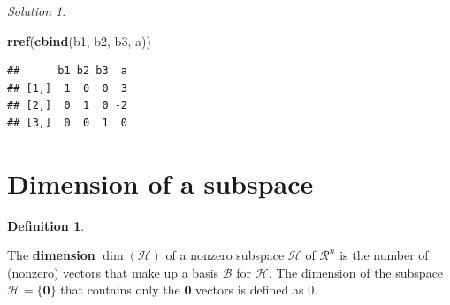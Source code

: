 \documentclass[
]{book}
\newenvironment{Shaded}{\begin{snugshade}}{\end{snugshade}}
\newcommand{\KeywordTok}[1]{\textcolor[rgb]{0.13,0.29,0.53}{\textbf{#1}}}
\newcommand{\NormalTok}[1]{#1}
\theoremstyle{definition}
\newtheorem{definition}{Definition}[chapter]
\theoremstyle{definition}
\theoremstyle{definition}
\theoremstyle{remark}
\newtheorem*{solution}{Solution}
\begin{document}
\begin{solution}
\begin{Shaded}
\begin{Highlighting}[]
\KeywordTok{rref}\NormalTok{(}\KeywordTok{cbind}\NormalTok{(b1, b2, b3, a))}
\end{Highlighting}
\end{Shaded}

\begin{verbatim}
##      b1 b2 b3  a
## [1,]  1  0  0  3
## [2,]  0  1  0 -2
## [3,]  0  0  1  0
\end{verbatim}

\end{solution}

\hypertarget{dimension-of-a-subspace}{%
\section{Dimension of a subspace}\label{dimension-of-a-subspace}}

\begin{definition}
\protect\hypertarget{def:dimension}{}\label{def:dimension}

The \textbf{dimension} \(\operatorname{dim}(\mathcal{H})\) of a nonzero subspace \(\mathcal{H}\) of \(\mathcal{R}^n\) is the number of (nonzero) vectors that make up a basis \(\mathcal{B}\) for \(\mathcal{H}\). The dimension of the subspace \(\mathcal{H} = \{\mathbf{0}\}\) that contains only the \(\mathbf{0}\) vectors is defined as 0.

\end{definition}
\end{document}
